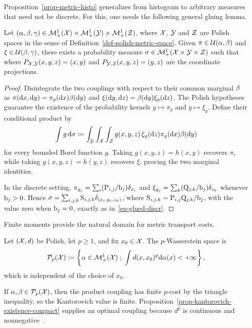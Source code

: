 Proposition~\ref{prop-metric-histo} generalizes from histogram to arbitrary measures that need not be discrete. For this, one needs the following general gluing lemma.

\begin{lem}\label{lem-gluing-general}
		Let $(\alpha,\beta,\gamma) \in \mathcal{M}_+^1(\mathcal{X}) \times \mathcal{M}_+^1(\mathcal{Y}) \times \mathcal{M}_+^1(\mathcal{Z})$, where $\mathcal{X}$, $\mathcal{Y}$ and $\mathcal{Z}$ are Polish spaces in the sense of Definition~\ref{def-polish-metric-space}.
		Given $\pi \in \mathcal{U}(\alpha,\beta)$ and $\xi \in \mathcal{U}(\beta,\gamma)$, there exists a probability measure
		$\sigma \in \mathcal{M}_+^1(\mathcal{X} \times \mathcal{Y} \times \mathcal{Z})$ such that
		where $P_{\mathcal{X},\mathcal{Y}}(x,y,z)=(x,y)$ and $P_{\mathcal{Y},\mathcal{Z}}(x,y,z)=(y,z)$ are the coordinate projections.
\end{lem}
\begin{proof}
		Disintegrate the two couplings with respect to their common marginal $\beta$ as
		$\pi(\mathrm{d} x,\mathrm{d} y)=\pi_y(\mathrm{d} x)\beta(\mathrm{d} y)$ and
		$\xi(\mathrm{d} y,\mathrm{d} z)=\beta(\mathrm{d} y)\xi_y(\mathrm{d} z)$.
		The Polish hypotheses guarantee the existence of the probability kernels $y\mapsto\pi_y$ and $y\mapsto\xi_y$. Define their conditional product by
		\[
			\int g\,\mathrm{d}\sigma
			\coloneqq
			\int_{\mathcal{Y}}\int_{\mathcal{X}}\int_{\mathcal{Z}}
			g(x,y,z)\,\xi_y(\mathrm{d} z)\pi_y(\mathrm{d} x)\beta(\mathrm{d} y)
		\]
		for every bounded Borel function $g$. Taking $g(x,y,z)=h(x,y)$ recovers $\pi$, while taking $g(x,y,z)=h(y,z)$ recovers $\xi$, proving the two marginal identities.

		In the discrete setting, $\pi_{y_j}=\sum_i(\mathrm{P}_{i,j}/\mathrm{b}_j)\delta_{x_i}$ and $\xi_{y_j}=\sum_k(\mathrm{Q}_{j,k}/\mathrm{b}_j)\delta_{z_k}$ whenever $\mathrm{b}_j>0$. Hence
		$\sigma=\sum_{i,j,k}\mathrm{S}_{i,j,k}\delta_{(x_i,y_j,z_k)}$, where
		$\mathrm{S}_{i,j,k}=\mathrm{P}_{i,j}\mathrm{Q}_{j,k}/\mathrm{b}_j$, with the value zero when $\mathrm{b}_j=0$,
		exactly as in~\eqref{eq-glued-discr}.
\end{proof}

Finite moments provide the natural domain for metric transport costs.
\begin{defn}\label{def-p-wasserstein-space}
Let $(\mathcal{X},d)$ be Polish, let $p\geq1$, and fix $x_0\in\mathcal{X}$. The $p$-Wasserstein space is
\[
	\mathcal{P}_p(\mathcal{X})
	\coloneqq
	\left\{ \alpha\in\mathcal{M}_+^1(\mathcal{X}) \;;\; \int d(x,x_0)^p\mathrm{d}\alpha(x)<+\infty \right\},
\]
which is independent of the choice of $x_0$.
\end{defn}
If $\alpha,\beta\in\mathcal{P}_p(\mathcal{X})$, then the product coupling has finite $p$-cost by the triangle inequality, so the Kantorovich value is finite. Proposition~\ref{prop-kantorovich-existence-compact} supplies an optimal coupling because $d^p$ is continuous and nonnegative~\cite{Villani09,SantambrogioBook}.

